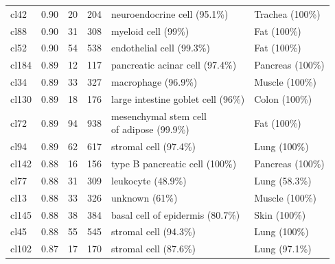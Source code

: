 \begin{table}[ht!]
\begin{tabular}{lrrrll}
  cl42 & 0.90 &  20 & 204 & neuroendocrine cell (95.1\%) & Trachea (100\%) \\ 
  cl88 & 0.90 &  31 & 308 & myeloid cell (99\%) & Fat (100\%) \\ 
  cl52 & 0.90 &  54 & 538 & endothelial cell (99.3\%) & Fat (100\%) \\ 
  cl184 & 0.89 &  12 & 117 & pancreatic acinar cell (97.4\%) & Pancreas (100\%) \\ 
  cl34 & 0.89 &  33 & 327 & macrophage (96.9\%) & Muscle (100\%) \\ 
  cl130 & 0.89 &  18 & 176 & large intestine goblet cell (96\%) & Colon (100\%) \\ 
  cl72 & 0.89 &  94 & 938 & \specialcell[t]{mesenchymal stem cell\\of adipose (99.9\%)} & Fat (100\%) \\ 
  cl94 & 0.89 &  62 & 617 & stromal cell (97.4\%) & Lung (100\%) \\ 
  cl142 & 0.88 &  16 & 156 & type B pancreatic cell (100\%) & Pancreas (100\%) \\ 
  cl77 & 0.88 &  31 & 309 & leukocyte (48.9\%) & Lung (58.3\%) \\ 
  cl13 & 0.88 &  33 & 326 & unknown (61\%) & Muscle (100\%) \\ 
  cl145 & 0.88 &  38 & 384 & basal cell of epidermis (80.7\%) & Skin (100\%) \\ 
  cl45 & 0.88 &  55 & 545 & stromal cell (94.3\%) & Lung (100\%) \\ 
  cl102 & 0.87 &  17 & 170 & stromal cell (87.6\%) & Lung (97.1\%) \\ 
   \bottomrule
\end{tabular}
\end{table}

